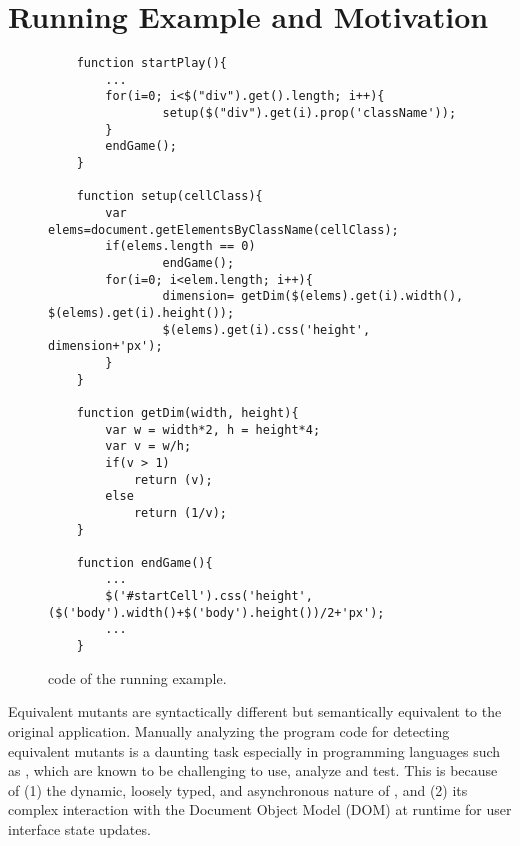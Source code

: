 \section{Running Example and Motivation} \label{motivation}

\begin{figure}
\medskip
\begin{lstlisting}
	function startPlay(){
		...		
		for(i=0; i<$("div").get().length; i++){
				setup($("div").get(i).prop('className'));	
		}	
		endGame();
	}
	
	function setup(cellClass){
		var elems=document.getElementsByClassName(cellClass);
		if(elems.length == 0)
				endGame();
		for(i=0; i<elem.length; i++){
				dimension= getDim($(elems).get(i).width(), $(elems).get(i).height());
				$(elems).get(i).css('height', dimension+'px');
		}
	}
	
	function getDim(width, height){
		var w = width*2, h = height*4;
		var v = w/h;
		if(v > 1)
			return (v);
		else
			return (1/v);
	}
	
	function endGame(){
		...
		$('#startCell').css('height', ($('body').width()+$('body').height())/2+'px');
		...
	}	
\end{lstlisting}
\vspace{-0.1in} 

\caption{\javascript code of the running example.}
\label{Fig:example}
\vspace{-0.1in} 

\end{figure}


Equivalent mutants are syntactically different but semantically equivalent to the original application.
Manually analyzing the program code for detecting equivalent mutants is a daunting task especially in programming languages such as \javascript, which are known to be challenging to use, analyze and test. This is because of (1) the dynamic, loosely typed, and asynchronous nature of \javascript, and (2) its complex 
interaction with the Document Object Model (DOM) at runtime for user interface state updates.


